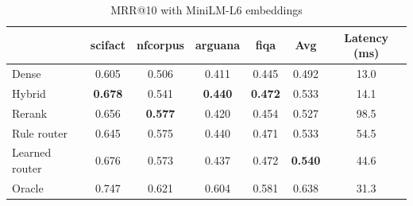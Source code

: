 \begin{table}[t]
\centering
\caption{MRR@10 with MiniLM-L6 embeddings}
\label{tab:mrr_MiniLM-L6}
\begin{tabular}{lcccccc}
\toprule
 & scifact & nfcorpus & arguana & fiqa & Avg & Latency (ms) \\
\midrule
Dense & 0.605 & 0.506 & 0.411 & 0.445 & 0.492 & 13.0 \\
Hybrid & \textbf{0.678} & 0.541 & \textbf{0.440} & \textbf{0.472} & 0.533 & 14.1 \\
Rerank & 0.656 & \textbf{0.577} & 0.420 & 0.454 & 0.527 & 98.5 \\
\midrule
Rule router & 0.645 & 0.575 & 0.440 & 0.471 & 0.533 & 54.5 \\
Learned router & 0.676 & 0.573 & 0.437 & 0.472 & \textbf{0.540} & 44.6 \\
Oracle & 0.747 & 0.621 & 0.604 & 0.581 & 0.638 & 31.3 \\
\bottomrule
\end{tabular}
\end{table}